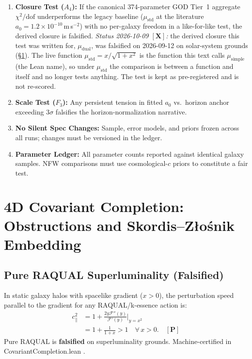 \documentclass[aps,prd,preprint,superscriptaddress,nofootinbib,amsmath,amssymb,floatfix]{revtex4-2}
\makeatletter
\DeclareRobustCommand{\rntexttt}[1]{%
  \ifmmode
    \nfss@text{\ttfamily\hyphenchar\font=-1 #1}%
  \else
    \hmode@bgroup\ttfamily\hyphenchar\font=-1 #1\egroup
  \fi}
\DeclareRobustCommand{\_}{%
    \ifmmode\nfss@text{\textunderscore}\else\textunderscore\penalty\z@\fi}%
\let\texttt\rntexttt
\makeatother
\begin{document}
\begin{tcolorbox}[colback=boxbg,colframe=primary,title=\textbf{Pre-Registered Interpretation Contract}]
\begin{enumerate}
    \item \textbf{Closure Test ($A_4$):} If the canonical 374-parameter GOD Tier~1 aggregate $\chi^2/\text{dof}$ underperforms the legacy baseline ($\mu_{\text{std}}$ at the literature $a_0 = 1.2\times10^{-10}$\,m\,s$^{-2}$) with no per-galaxy freedom in a like-for-like test, the derived closure is falsified.
    \textit{Status 2026-10-09 $\mathbf{[X]}$:} the derived closure this test was written for, $\mu_{\text{dual}}$, was falsified on 2026-09-12 on solar-system grounds (\S\ref{sec:covariant}). The live function $\mu_{\text{std}} = x/\sqrt{1+x^2}$ is the function this text calls $\mu_{\text{simple}}$ (the Lean name), so under $\mu_{\text{std}}$ the comparison is between a function and itself and no longer tests anything. The test is kept as pre-registered and is not re-scored.
    \item \textbf{Scale Test ($F_3$):} Any persistent tension in fitted $a_0$ vs.\ horizon anchor exceeding $3\sigma$ falsifies the horizon-normalization narrative.
    \item \textbf{No Silent Spec Changes:} Sample, error models, and priors frozen across all runs; changes must be versioned in the ledger.
    \item \textbf{Parameter Ledger:} All parameter counts reported against identical galaxy samples. NFW comparisons must use cosmological-$c$ priors to constitute a fair test.
\end{enumerate}
\end{tcolorbox}

\section[4D Covariant Completion: Obstructions and Skordis--Z\l{}o\'snik Embedding]{4D Covariant Completion:\\ Obstructions and Skordis--Z\l{}o\'snik Embedding}
\label{sec:covariant}

\subsection{Pure RAQUAL Superluminality (Falsified)}

In static galaxy halos with spacelike gradient ($x > 0$), the perturbation speed parallel to the gradient for any RAQUAL/k-essence action is:
\begin{equation}
\begin{aligned}
c_\parallel^2 &= 1 + \frac{2y\mathcal{F}''(y)}{\mathcal{F}'(y)}\bigg|_{y=x^2} \\
&= 1 + \frac{1}{1+x} > 1 \quad \forall\, x > 0. \quad \mathbf{[P]}
\end{aligned}
\end{equation}
Pure RAQUAL is \textbf{falsified} on superluminality grounds. Machine-certified in \texttt{Covariant\allowbreak{}Completion.lean}.
\end{document}
